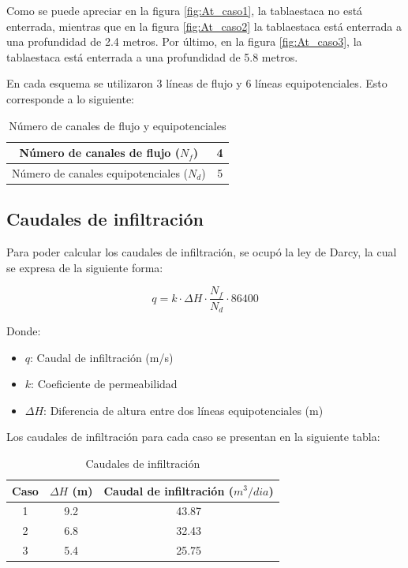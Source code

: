 \documentclass{article}
\begin{document}
Como se puede apreciar en la figura \ref{fig:At_caso1}, la tablaestaca no está enterrada, mientras que en la figura \ref{fig:At_caso2} la tablaestaca está enterrada a una profundidad de 2.4 metros. Por último, en la figura \ref{fig:At_caso3}, la tablaestaca está enterrada a una profundidad de 5.8 metros.

En cada esquema se utilizaron 3 líneas de flujo y 6 líneas equipotenciales. Esto corresponde a lo siguiente:

\begin{table}[h!]
  \centering
  \begin{tabular}{|c|c|}
    \hline
    Número de canales de flujo ($N_f$)& 4 \\ \hline
    Número de canales equipotenciales ($N_d$) & 5 \\ \hline
  \end{tabular}
  \caption{Número de canales de flujo y equipotenciales}
\end{table}

\subsection{Caudales de infiltración}
Para poder calcular los caudales de infiltración, se ocupó la ley de Darcy, la cual se expresa de la siguiente forma:

\begin{equation}
    q = k \cdot \Delta H \cdot \frac{N_f}{N_d} \cdot 86400
\end{equation}

Donde:
\begin{itemize}
    \item $q$: Caudal de infiltración (m/s)
    \item $k$: Coeficiente de permeabilidad
    \item $\Delta H$: Diferencia de altura entre dos líneas equipotenciales (m)
\end{itemize}



Los caudales de infiltración para cada caso se presentan en la siguiente tabla:

\begin{table}[h!]
  \centering
  \begin{tabular}{ccc}
    \hline
    \textbf{Caso} &\textbf{$\Delta H$ (m)}  &\textbf{Caudal de infiltración ($m^3/dia$)} \\
    \hline
    1 &9.2 &43.87 \\
    2 & 6.8&32.43\\
    3 &5.4 &25.75\\
    \hline
  \end{tabular}
  \caption{Caudales de infiltración}
  \label{tab:caudales}
\end{table}
\end{document}
